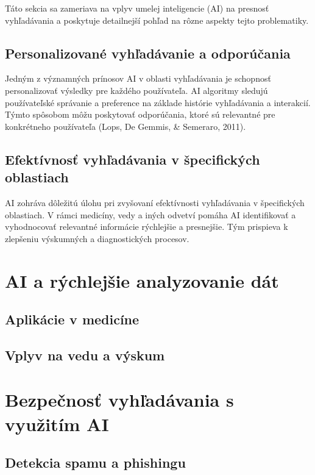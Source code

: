 \documentclass[10pt,twoside,slovak,a4paper]{article}
\begin{document}
Táto sekcia sa zameriava na vplyv umelej inteligencie (AI) na presnosť vyhľadávania a poskytuje detailnejší pohľad na rôzne aspekty tejto problematiky.

\subsection{Personalizované vyhľadávanie a odporúčania}
\label{subsec:personalizovane-vyhledavanie}

Jedným z významných prínosov AI v oblasti vyhľadávania je schopnosť personalizovať výsledky pre každého používateľa. AI algoritmy sledujú používateľské správanie a preference na základe histórie vyhľadávania a interakcií. Týmto spôsobom môžu poskytovať odporúčania, ktoré sú relevantné pre konkrétneho používateľa (Lops, De Gemmis, & Semeraro, 2011).

\subsection{Efektívnosť vyhľadávania v špecifických oblastiach}
\label{subsec:efektivnost-vyhledavani}

AI zohráva dôležitú úlohu pri zvyšovaní efektívnosti vyhľadávania v špecifických oblastiach. V rámci medicíny, vedy a iných odvetví pomáha AI identifikovať a vyhodnocovať relevantné informácie rýchlejšie a presnejšie. Tým prispieva k zlepšeniu výskumných a diagnostických procesov.

\section{AI a rýchlejšie analyzovanie dát}

\subsection{Aplikácie v medicíne}

\subsection{Vplyv na vedu a výskum}

\section{Bezpečnosť vyhľadávania s využitím AI}

\subsection{Detekcia spamu a phishingu}
\end{document}
